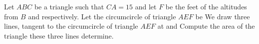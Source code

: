 Let $ABC$ be a triangle such that   $CA = 15$ and let  $F$ be the feet of the altitudes from $B$ and  respectively.
Let the circumcircle of triangle $AEF$ be 
We draw three lines, tangent to the circumcircle of triangle $AEF$ at   and 
Compute the area of the triangle these three lines determine.